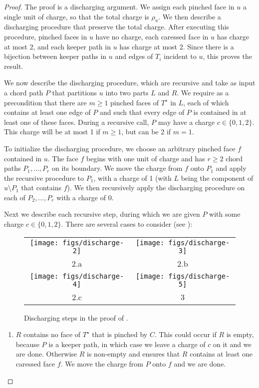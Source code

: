 \documentclass[a4paper,UKenglish]{socg-lipics-v2019}
\newcommand{\dual}[1]{{#1}^\star}
\begin{document}
\begin{proof}
   The proof is a discharging argument.  We assign each pinched face in 
   $u$ a single unit of charge, so that the total charge is $\rho_u$.
   We then describe a discharging procedure that preserve the total
   charge.  After executing this procedure, pinched faces in $u$
   have no charge, each caressed face in $u$ has charge at most 2,
   and each keeper path in $u$ has charge at most 2.  Since there is a
   bijection between keeper paths in $u$ and edges of $T_i$ incident to
   $u$, this proves the result.

   We now describe the discharging procedure, which are recursive and take as
   input a chord path $P$ that partitions $u$ into two parts $L$ and $R$.
   We require as a precondition that there are $m\ge 1$ pinched faces
   of $\dual{T}$ in $L$, each of which contains at least one edge of $P$ and
   such that every edge of $P$ is contained in at least one of these faces.
   During a recursive call, $P$ may have a charge $c\in\{0,1,2\}$. This
   charge will be at most 1 if $m\ge 1$, but can be 2 if $m=1$.

   To initialize the discharging procedure, we choose an arbitrary pinched
   face $f$ contained in $u$.  The face $f$ begins with one unit of charge
   and has $r\ge 2$ chord paths $P_1,\ldots,P_r$ on its boundary.
   We move the charge from $f$ onto $P_1$ and apply the recursive
   procedure to $P_1$, with a charge of 1 (with $L$ being the component
   of $u\setminus P_1$ that contains $f$).  We then recursively apply the
   discharging procedure on each of $P_2,\ldots,P_r$ with a charge of 0.

   Next we describe each recursive step, during which we are given $P$
   with some charge $c\in\{0,1,2\}$.  There are several cases to consider
   (see ):
	\begin{figure}
		\begin{center}
		\begin{tabular}{cc}
			\texttt{[image: figs/discharge-2]} &
			\texttt{[image: figs/discharge-3]} \\
			 2.a & 2.b \\[1.5em]
			\texttt{[image: figs/discharge-4]} &
			\texttt{[image: figs/discharge-5]} \\
			 2.c & 3 
		\end{tabular}
		\end{center}
		\caption{Discharging steps in the proof of .}
	\end{figure}
  \begin{enumerate}
     \item $R$ contains no face of $\dual{T}$ that is pinched by $C$.
     This could occur if $R$ is empty, because $P$ is a keeper path,
     in which case we leave a charge of $c$ on it and we are done.
     Otherwise $R$ is non-empty and   ensures that
     $R$ contains at least one caressed face $f$.  We move the charge
     from $P$ onto $f$ and we are done.


\end{enumerate}
\end{proof}
\end{document}
